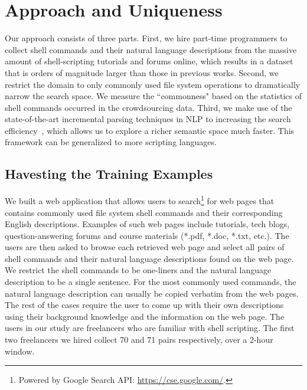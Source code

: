 \section{Approach and Uniqueness}

Our approach consists of three parts. First, we hire part-time programmers to collect shell commands and their natural language descriptions from the massive amount of shell-scripting tutorials and forums online, which results in a dataset that is orders of magnitude larger than those in previous works. Second, we restrict the domain to only commonly used file system operations to dramatically narrow the search space. We measure the ``commonness" based on the statistics of shell commands occurred in the crowdsourcing data. Third, we make use of the state-of-the-art incremental parsing techniques in NLP to increasing the search efficiency~\cite{zhao2014type,dyer2015transition,huang2010dynamic}, which allows us to explore a richer semantic space much faster. This framework can be generalized to more scripting languages.

\subsection{Havesting the Training Examples}

We built a web application that allows users to search\footnote{Powered by Google Search API: \url{https://cse.google.com/}.} for web pages that contains commonly used file system shell commands and their corresponding English descriptions. Examples of such web pages include tutorials, tech blogs, question-answering forums and course materials (*.pdf, *.doc, *.txt, etc.). The users are then asked to browse each retrieved web page and select all pairs of shell commands and their natural language descriptions found on the web page. We restrict the shell commands to be one-liners and the natural language description to be a single sentence. For the most commonly used commands, the natural language description can usually be copied verbatim from the web pages. The rest of the cases require the user to come up with their own descriptions using their background knowledge and the information on the web page. The users in our study are freelancers who are familiar with shell scripting. %
The first two freelancers we hired collect 70 and 71 pairs respectively, over a 2-hour window. 

